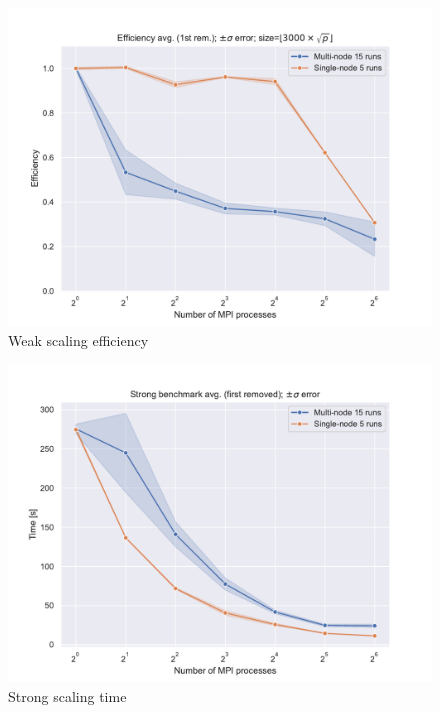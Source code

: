 \documentclass[unicode,11pt,a4paper,oneside,numbers=endperiod,openany]{scrartcl}
\begin{document}
\begin{figure}
      \centering
      \includegraphics[width=1\linewidth]{plots/power_weak_efficiency.pdf}
      \caption{Weak scaling efficiency}
      \label{fig:powermethod_efficiency}
\end{figure}

\begin{figure}
      \centering
      \includegraphics[width=1\linewidth]{plots/power_strong_scaling.pdf}
      \caption{Strong scaling time}
      \label{fig:powermethod_time}
\end{figure}
\end{document}
